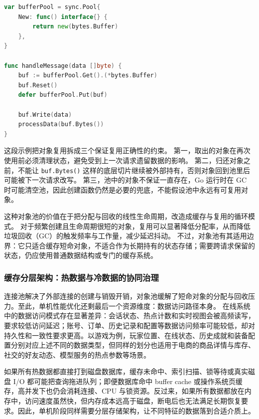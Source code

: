 \begin{tcolorbox}[title=短命缓冲区的复用路径（示意）]
\begin{lstlisting}[style=codeblock, language=go]
var bufferPool = sync.Pool{
    New: func() interface{} {
        return new(bytes.Buffer)
    },
}

func handleMessage(data []byte) {
    buf := bufferPool.Get().(*bytes.Buffer)
    buf.Reset()
    defer bufferPool.Put(buf)
    
    buf.Write(data)
    processData(buf.Bytes())
}
\end{lstlisting}
\end{tcolorbox}

这段示例把对象复用拆成三个保证复用正确性的约束。
第一，取出的对象在再次使用前必须清理状态，避免受到上一次请求遗留数据的影响。
第二，归还对象之前，不能让 \texttt{buf.Bytes()} 这样的底层切片继续被外部持有，否则对象回到池里后可能被下一次请求改写。
第三，池中的对象不保证一直存在，Go 运行时在 GC 时可能清空池，因此创建函数仍然是必要的兜底，不能假设池中永远有可复用对象。

这种对象池的价值在于把分配与回收的线性生命周期，改造成缓存与复用的循环模式。
对于频繁创建且生命周期很短的对象，复用可以显著降低分配率，从而降低垃圾回收（GC）的触发频率与工作量，减少延迟抖动。
不过，对象池有其适用边界：它只适合缓存短命对象，不适合作为长期持有的状态存储；需要跨请求保留的状态，仍应使用普通数据结构或专门的缓存系统。

\subsubsection{缓存分层架构：热数据与冷数据的协同治理}\label{sec3:cache-layering}

连接池解决了外部连接的创建与销毁开销，对象池缓解了短命对象的分配与回收压力。至此，单机性能优化还剩最后一个资源维度：数据访问路径本身。
在线系统中的数据访问模式存在显著差异：会话状态、热点计数和实时视图会被高频读写，要求较低访问延迟；账号、订单、历史记录和配置等数据访问频率可能较低，却对持久性和一致性要求更高。以游戏为例，玩家位置、在线状态、历史成就和装备配置分别对应上述不同的数据类型，但同样的划分也适用于电商的商品详情与库存、社交的好友动态、模型服务的热点参数等场景。

如果所有热数据都直接打到磁盘数据库，缓存未命中、索引扫描、锁等待或真实磁盘 I/O 都可能把查询拖进队列；即便数据库命中 buffer cache 或操作系统页缓存，高并发下也仍会消耗连接、CPU 与锁资源。反过来，如果所有数据都放在内存中，访问速度虽然快，但内存成本远高于磁盘，断电后也无法满足长期恢复要求。因此，单机阶段同样需要分层存储架构，让不同特征的数据落到合适介质上。

